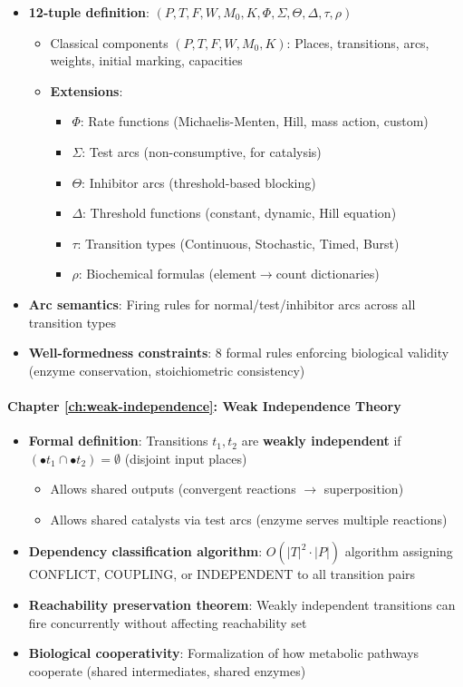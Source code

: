 \begin{itemize}
    \item \textbf{12-tuple definition}: $(P, T, F, W, M_0, K, \Phi, \Sigma, \Theta, \Delta, \tau, \rho)$
    \begin{itemize}
        \item Classical components $(P, T, F, W, M_0, K)$: Places, transitions, arcs, weights, initial marking, capacities
        \item \textbf{Extensions}:
        \begin{itemize}
            \item $\Phi$: Rate functions (Michaelis-Menten, Hill, mass action, custom)
            \item $\Sigma$: Test arcs (non-consumptive, for catalysis)
            \item $\Theta$: Inhibitor arcs (threshold-based blocking)
            \item $\Delta$: Threshold functions (constant, dynamic, Hill equation)
            \item $\tau$: Transition types (Continuous, Stochastic, Timed, Burst)
            \item $\rho$: Biochemical formulas (element$\to$count dictionaries)
        \end{itemize}
    \end{itemize}
    \item \textbf{Arc semantics}: Firing rules for normal/test/inhibitor arcs across all transition types
    \item \textbf{Well-formedness constraints}: 8 formal rules enforcing biological validity (enzyme conservation, stoichiometric consistency)
\end{itemize}

\paragraph{Chapter \ref{ch:weak-independence}: Weak Independence Theory}

\begin{itemize}
    \item \textbf{Formal definition}: Transitions $t_1, t_2$ are \textbf{weakly independent} if $(\bullet t_1 \cap \bullet t_2) = \emptyset$ (disjoint input places)
    \begin{itemize}
        \item Allows shared outputs (convergent reactions $\to$ superposition)
        \item Allows shared catalysts via test arcs (enzyme serves multiple reactions)
    \end{itemize}
    \item \textbf{Dependency classification algorithm}: $O(|T|^2 \cdot |P|)$ algorithm assigning CONFLICT, COUPLING, or INDEPENDENT to all transition pairs
    \item \textbf{Reachability preservation theorem}: Weakly independent transitions can fire concurrently without affecting reachability set
    \item \textbf{Biological cooperativity}: Formalization of how metabolic pathways cooperate (shared intermediates, shared enzymes)
\end{itemize}

